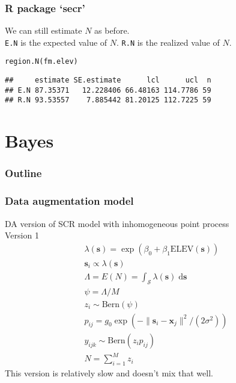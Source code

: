 \documentclass[color=usenames,dvipsnames]{beamer}\usepackage[]{graphicx}\usepackage[]{color}
\makeatletter
\newcommand{\hlstd}[1]{\textcolor[rgb]{0,0,0}{#1}}%
\newcommand{\hlkwd}[1]{\textcolor[rgb]{0.004,0.004,0.506}{#1}}%
\newenvironment{kframe}{%
 \def\at@end@of@kframe{}%
 \ifinner\ifhmode%
  \def\at@end@of@kframe{\end{minipage}}%
  \begin{minipage}{\columnwidth}%
 \fi\fi%
 \def\FrameCommand##1{\hskip\@totalleftmargin \hskip-\fboxsep
 \colorbox{shadecolor}{##1}\hskip-\fboxsep
     \hskip-\linewidth \hskip-\@totalleftmargin \hskip\columnwidth}%
 \MakeFramed {\advance\hsize-\width
   \@totalleftmargin\z@ \linewidth\hsize
   \@setminipage}}%
 {\par\unskip\endMakeFramed%
 \at@end@of@kframe}
\newenvironment{knitrout}{}{} %
\newcommand{\inr}[1]{\colorbox{inlinecolor}{\texttt{#1}}}
\newcommand{\bxj}{{\bm x}_j}
\newcommand{\bs}{{\bm s}}
\newcommand{\bsi}{{\bm s}_i}
\makeatother
\begin{document}
\begin{frame}[fragile]
  \frametitle{R package `secr'}
  We can still estimate $N$ as before. \\
  \vfill
  \inr{E.N} is the expected value of
  $N$. \inr{R.N} is the realized value of $N$. 
  \vfill
\begin{knitrout}\small
{}\color{fgcolor}\begin{kframe}
\begin{alltt}
\hlkwd{region.N}\hlstd{(fm.elev)}
\end{alltt}
\begin{verbatim}
##     estimate SE.estimate      lcl      ucl  n
## E.N 87.35371   12.228406 66.48163 114.7786 59
## R.N 93.53557    7.885442 81.20125 112.7225 59
\end{verbatim}
\end{kframe}
\end{knitrout}
\end{frame}




\section{Bayes}




\begin{frame}
  \frametitle{Outline}
  \Large
  \tableofcontents[currentsection]
\end{frame}





\begin{frame}
  \frametitle{Data augmentation model}
  DA version of SCR model with inhomogeneous point process \\
  \centering
  Version 1 \\
  \begin{gather*}
    \lambda(\bs) = \exp(\beta_0 + \beta_1 \mathrm{ELEV}(\bs)) \\
    \bsi \propto \lambda(\bs) \\
    \Lambda = E(N) = \int_{\mathcal{S}} \lambda(\bs)\; \mathrm{d}\bs \\
    \psi = \Lambda/M \\
    z_i \sim \mathrm{Bern}(\psi) \\
    p_{ij} = g_0\exp(-\|\bsi-\bxj\|^2/(2\sigma^2)) \\
    y_{ijk} \sim \mathrm{Bern}(z_i p_{ij}) \\
    N=\sum_{i=1}^M z_i
  \end{gather*}
  \pause \vfill
  This version is relatively slow and doesn't mix that well. \\
\end{frame}
\end{document}
